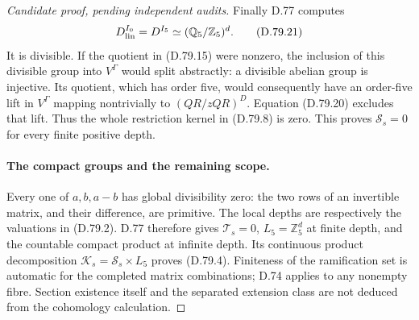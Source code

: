 \begin{proof}[Candidate proof, pending independent audits]
Finally D.77 computes
\[
 D_{\rm lin}^{I_0}=D^{I_5}
                  \simeq(\mathbb Q_5/\mathbb Z_5)^d.   \tag{D.79.21}
\]
It is divisible. If the quotient in (D.79.15) were nonzero,
the inclusion of this divisible group into \(V^\Gamma\)
would split abstractly: a divisible abelian group is injective.
Its quotient, which has order five, would consequently have
an order-five lift in \(V^\Gamma\) mapping nontrivially to
\((QR/zQR)^D\). Equation (D.79.20) excludes that lift.
Thus the whole restriction kernel in (D.79.8) is zero.
This proves \(\mathcal S_s=0\) for every finite positive depth.

\paragraph{The compact groups and the remaining scope.}
Every one of \(a,b,a-b\) has global divisibility zero: the two
rows of an invertible matrix, and their difference, are
primitive. The local depths are respectively the valuations
in (D.79.2). D.77 therefore gives \(\mathcal T_s=0\),
\(L_5=\mathbb Z_5^d\) at finite depth, and the countable
compact product at infinite depth. Its continuous product
decomposition \(\mathcal K_s=\mathcal S_s\times L_5\)
proves (D.79.4). Finiteness of the ramification set is automatic
for the completed matrix combinations; D.74 applies to any
nonempty fibre. Section existence itself and the separated
extension class are not deduced from the cohomology calculation.
\end{proof}
